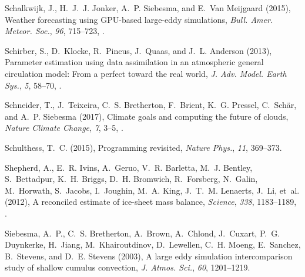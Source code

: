 \documentclass[draft]{agujournal}
\begin{document}
\begin{thebibliography}{196}
Schalkwijk, J., H.~J.~J. Jonker, A.~P. Siebesma, and E.~{Van Meijgaard} (2015),
  Weather forecasting using {GPU}-based large-eddy simulations, \textit{Bull.
  Amer. Meteor. Soc.}, \textit{96}, 715--723, .

Schirber, S., D.~Klocke, R.~Pincus, J.~Quaas, and J.~L. Anderson (2013),
  Parameter estimation using data assimilation in an atmospheric general
  circulation model: From a perfect toward the real world, \textit{J. Adv.
  Model. Earth Sys.}, \textit{5}, 58--70, .

Schneider, T., J.~Teixeira, C.~S. Bretherton, F.~Brient, K.~G. Pressel,
  C.~Sch{\"a}r, and A.~P. Siebesma (2017), Climate goals and computing the
  future of clouds, \textit{Nature Climate Change}, \textit{7}, 3--5,
  .

Schulthess, T.~C. (2015), Programming revisited, \textit{Nature Phys.},
  \textit{11}, 369--373.

Shepherd, A., E.~R. Ivins, A.~Geruo, V.~R. Barletta, M.~J. Bentley,
  S.~Bettadpur, K.~H. Briggs, D.~H. Bromwich, R.~Forsberg, N.~Galin,
  M.~Horwath, S.~Jacobs, I.~Joughin, M.~A. King, J.~T.~M. Lenaerts, J.~Li,
  et~al. (2012), A reconciled estimate of ice-sheet mass balance,
  \textit{Science}, \textit{338}, 1183--1189, .

Siebesma, A.~P., C.~S. Bretherton, A.~Brown, A.~Chlond, J.~Cuxart, P.~G.
  Duynkerke, H.~Jiang, M.~Khairoutdinov, D.~Lewellen, C.~H. Moeng, E.~Sanchez,
  B.~Stevens, and D.~E. Stevens (2003), A large eddy simulation intercomparison
  study of shallow cumulus convection, \textit{J. Atmos. Sci.}, \textit{60},
  1201--1219.


\end{thebibliography}
\end{document}
